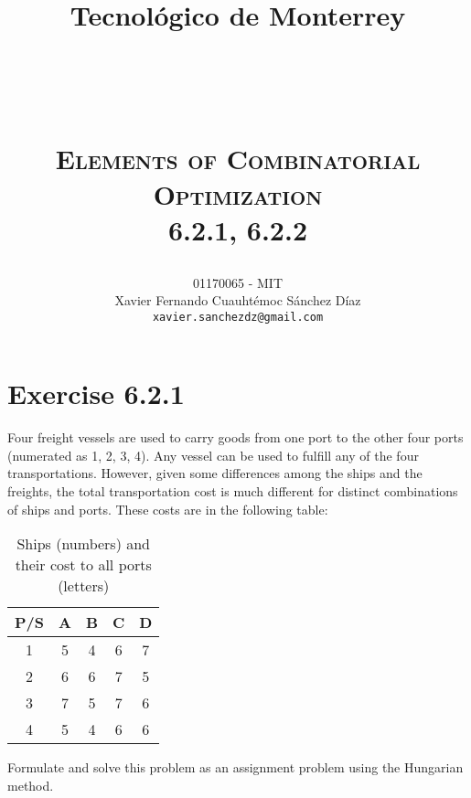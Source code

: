 \documentclass[titlepage, letterpaper, fleqn]{article}
\title{
\vspace{1in}
\textbf{Tecnológico de Monterrey} \\
\vspace{0.5in}
\textmd{\mahclass} \\
\large{\textit{\mahteacher}} \\
\vspace{0.5in}
\textsc{\mahtitle}\\
\textsc{Elements of Combinatorial Optimization}\\
\textsc{6.2.1, 6.2.2}\\
\author{01170065  - MIT \\
Xavier Fernando Cuauhtémoc Sánchez Díaz \\
\texttt{xavier.sanchezdz@gmail.com}}
\date{\mahdate}
}
\newcommand{\spacepls}{\vspace{5mm}}
\begin{document}
\begin{titlepage}
\maketitle
\end{titlepage}

%
%

\section{Exercise 6.2.1}

{\large Four freight vessels are used to carry goods from one port to the other four ports (numerated as 1, 2, 3, 4).
Any vessel can be used to fulfill any of the four transportations.
However, given some differences among the ships and the freights,
the total transportation cost is much different for distinct combinations of ships and ports.
These costs are in the following table:}

\begin{table}[h!]
\centering
\begin{tabular}{@{}ccccc@{}}
\toprule
P/S & A & B & C & D \\ \midrule
1   & 5 & 4 & 6 & 7 \\
2   & 6 & 6 & 7 & 5 \\
3   & 7 & 5 & 7 & 6 \\
4   & 5 & 4 & 6 & 6 \\ \bottomrule
\end{tabular}
\caption{Ships (numbers) and their cost to all ports (letters)}
\label{tab:6.2.1}
\end{table}

{\large Formulate and solve this problem as an assignment problem using the Hungarian method.}

\spacepls
\end{document}
